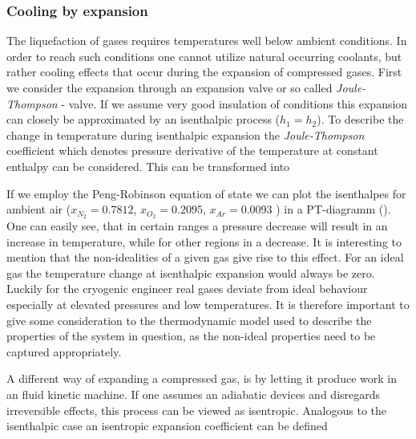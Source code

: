     \subsubsection{Cooling by expansion}
        The liquefaction of gases requires temperatures well below ambient conditions. In order to reach
        such conditions one cannot utilize natural occurring coolants, but rather cooling effects that occur
        during the expansion of compressed gases. First we consider the expansion through an expansion valve
        or so called \emph{Joule-Thompson} - valve. If we assume very good insulation of  conditions this
        expansion can closely be approximated by an isenthalpic process ($h_1 = h_2$). To describe the change
        in temperature during isenthalpic expansion the \emph{Joule-Thompson} coefficient
        which denotes pressure derivative of the temperature at constant enthalpy can be considered.
        This can be transformed into



        If we employ the Peng-Robinson equation of state we can plot the isenthalpes for ambient air
        ($x_{N_2}=0.7812$, $x_{O_2}=0.2095$, $x_{Ar}=0.0093$ ) in a PT-diagramm ().
        One can easily see, that in certain ranges a pressure decrease will result in an increase in temperature,
        while for other regions in a decrease. It is interesting to mention that the non-idealities
        of a given gas give rise to this effect. For an ideal gas the temperature change at isenthalpic
        expansion would always be zero. Luckily for the cryogenic engineer real gases deviate from ideal
        behaviour especially at elevated pressures and low temperatures. It is therefore important to give some
        consideration to the thermodynamic model used to describe the properties of the system in question, as the
        non-ideal properties need to be captured appropriately.

        A different way of expanding a compressed gas, is by letting it produce work in an fluid kinetic machine.
        If one assumes an adiabatic devices and disregards irreversible effects, this process can be viewed as
        isentropic. Analogous to the isenthalpic case an isentropic expansion coefficient can be defined

